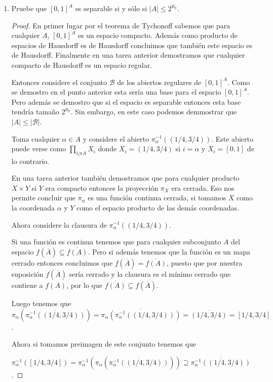 \documentclass[paper=letter, fontsize=11pt]{scrartcl} %
\numberwithin{equation}{section} %
\numberwithin{figure}{section} %
\numberwithin{table}{section} %
\begin{document}
\begin{enumerate}
\item Pruebe que $ [0,1]^A $ es separable si y sólo si $ |A|\leq 2^{\aleph_0} $.
\begin{proof}

En primer lugar por el teorema de Tychonoff sabemos que para cualquier $ A $, $ [0,1]^A $ es un espacio compacto. Además como producto de espacios de Hausdorff es de Hausdorff concluimos que también este espacio es de Hausdorff. Finalmente en una tarea anterior demostramos que cualquier compacto de Hausdorff es un espacio regular.

Entonces considere el conjunto $ \mathcal{B} $ de los abiertos regulares de $ [0,1]^A $. Como se demostro en el punto anterior esta sería una base para el espacio $ [0,1]^A $. Pero además se demostro que si el espacio es separable entonces esta base tendría tamaño $ 2^{\aleph_0}. $ Sin embargo, en este caso podemos demmostrar que $ |A| \leq |\mathcal{B}| $.

Toma cualquier $ \alpha \in A $ y considere el abierto $ \pi^{-1}_\alpha((1/4,3/4)) $. Este abierto puede verse como $ \prod_{i_in A} X_i $ donde $ X_i = (1/4,3/4) $ si $ i = \alpha $ y $ X_i = [0,1] $ de lo contrario.

En una tarea anterior también demostramos que para cualquier producto $ X \times Y $ si  $ Y $ era compacto entonces la proyección $ \pi_X $ era cerrada. Eso nos permite concluir que $ \pi_\alpha $ es una función continua cerrada, si tomamos $ X $ como la coordenada $ \alpha $ y $ Y $ como el espacio producto de las demás coordenadas.

Ahora considere la clausura de $ \pi^{-1}_\alpha((1/4,3/4)) $.

Si una función es continua tenemos que para cualquier subconjunto $ A $ del espacio $ f(\overline{A}) \subseteq \overline{f(A)} $. Pero si además tenemos que la función es un mapa cerrado entonces concluimos que $ f(\overline{A})=\overline{f(A)} $, puesto que por nuestra suposición $ f(\overline{A}) $ sería cerrado y la clausura es el mínimo cerrado que contiene a $ f(A) $, por lo que $ \overline{f(A)} \subseteq f(\overline{A}) $.

Luego tenemos que $\pi_\alpha(\overline{\pi^{-1}_\alpha((1/4,3/4))}) = \overline{\pi_\alpha(\pi_\alpha^{-1}((1/4,3/4)))}= \overline{(1/4,3/4)} = [1/4,3/4] $.

Ahora si tomamos preimagen de este conjunto tenemos que

 $ \pi_\alpha^{-1}([1/4,3/4]) = \pi_\alpha^{-1}(\pi_\alpha(\overline{\pi^{-1}_\alpha((1/4,3/4))})) \supseteq \overline{\pi^{-1}_\alpha((1/4,3/4))} $.


\end{proof}
\end{enumerate}
\end{document}
